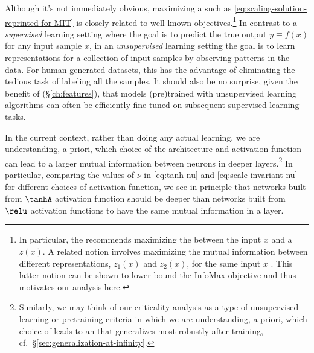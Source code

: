 Although it's not immediately obvious, maximizing a  such as \eqref{eq:scaling-solution-reprinted-for-MIT} is closely related to well-known  objectives.\footnote{In particular, the  \cite{linsker1988self} 
recommends
maximizing the  between the input $x$ and a  $z(x)$. A related notion involves maximizing the mutual information between different representations, $z_1(x)$ and $z_2(x)$, for the same input $x$  \cite{becker1992self}. %
This latter notion can be shown 
to
lower bound the InfoMax objective and thus motivates our analysis here.\label{footnote:info-max}} 
In contrast to a \emph{supervised} learning setting where the goal is to predict the true output $y\equiv f(x)$ for any input sample $x$, in an \emph{unsupervised} learning setting the goal is to learn representations for a collection of input samples by observing patterns in the data.
For human-generated datasets, this has the advantage of eliminating the tedious task of labeling all the samples.
It should also be no surprise, given the benefit of  (\S\ref{ch:features}), that models (pre)trained with unsupervised learning algorithms  can often be 
efficiently fine-tuned on subsequent supervised learning tasks.


In the current context, rather than doing any actual learning,
we are understanding, a priori, which choice of the architecture and activation function can lead to a larger mutual information between neurons in deeper layers.\footnote{
    Similarly, we may think of our criticality analysis as a type of unsupervised learning or pretraining criteria in which we are understanding, a priori, which choice of  leads to an  that generalizes most robustly after training, cf.~\S\ref{sec:generalization-at-infinity}.
} 
In particular, comparing the values of $\nu$ in \eqref{eq:tanh-nu} and \eqref{eq:scale-invariant-nu} for different choices of activation function, we see in principle that
networks built from $\tanhA$ activation function should be deeper than networks built from $\relu$ activation functions to have the same mutual information in a layer.


